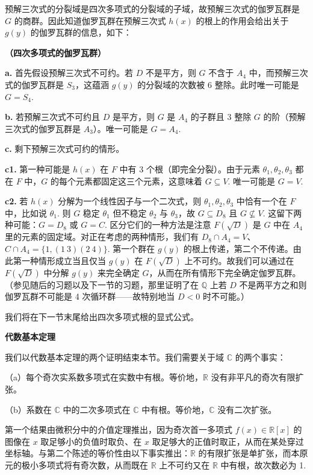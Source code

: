 预解三次式的分裂域是四次多项式的分裂域的子域，故预解三次式的伽罗瓦群是 \(G\) 的商群。因此知道伽罗瓦群在预解三次式 \(h(x)\) 的根上的作用会给出关于 \(g(y)\) 的伽罗瓦群的信息，如下：

\noindent\textbf{（四次多项式的伽罗瓦群）}

\textbf{a.} 首先假设预解三次式不可约。若 \(D\) 不是平方，则 \(G\) 不含于 \(A_4\) 中，而预解三次式的伽罗瓦群是 \(S_3\)，这蕴涵 \(g(y)\) 的分裂域的次数被 6 整除。此时唯一可能是 \(G = S_4\).

\textbf{b.} 若预解三次式不可约且 \(D\) 是平方，则 \(G\) 是 \(A_4\) 的子群且 3 整除 \(G\) 的阶（预解三次式的伽罗瓦群是 \(A_3\)）。唯一可能是 \(G = A_4\).

\textbf{c.} 剩下预解三次式可约的情形。

\textbf{c1.} 第一种可能是 \(h(x)\) 在 \(F\) 中有 3 个根（即完全分裂）。由于元素 \(\theta_1, \theta_2, \theta_3\) 都在 \(F\) 中，\(G\) 的每个元素都固定这三个元素，这意味着 \(G \subseteq V\). 唯一可能是 \(G = V\).

\textbf{c2.} 若 \(h(x)\) 分解为一个线性因子与一个二次式，则 \(\theta_1, \theta_2, \theta_3\) 中恰有一个在 \(F\) 中，比如说 \(\theta_1\). 则 \(G\) 稳定 \(\theta_1\) 但不稳定 \(\theta_2\) 与 \(\theta_3\)，故 \(G \subseteq D_8\) 且 \(G \not\subseteq V\). 这留下两种可能：\(G = D_8\) 或 \(G = C\). 区分它们的一种方法是注意 \(F(\sqrt{D})\) 是 \(G\) 中在 \(A_4\) 里的元素的固定域。对正在考虑的两种情形，我们有 \(D_8 \cap A_4 = V\)、\(C \cap A_4 = \{1, (1\ 3)(2\ 4)\}\). 第一个群在 \(g(y)\) 的根上传递，第二个不传递。由此第一种情形成立当且仅当 \(g(y)\) 在 \(F(\sqrt{D})\) 上不可约。故我们可以通过在 \(F(\sqrt{D})\) 中分解 \(g(y)\) 来完全确定 \(G\)，从而在所有情形下完全确定伽罗瓦群。（参见随后的习题以及下一节的习题，那里证明了在 \(\mathbb{Q}\) 上若 \(D\) 不是两平方之和则伽罗瓦群不可能是 4 次循环群——故特别地当 \(D < 0\) 时不可能。）

我们将在下一节末尾给出四次多项式根的显式公式。

\noindent\textbf{代数基本定理}

我们以代数基本定理的两个证明结束本节。我们需要关于域 \(\mathbb{C}\) 的两个事实：

（a）每个奇次实系数多项式在实数中有根。等价地，\(\mathbb{R}\) 没有非平凡的奇次有限扩张。

（b）系数在 \(\mathbb{C}\) 中的二次多项式在 \(\mathbb{C}\) 中有根。等价地，\(\mathbb{C}\) 没有二次扩张。

第一个结果由微积分中的介值定理推出，因为奇次首一多项式 \(f(x) \in \mathbb{R}[x]\) 的图像在 \(x\) 取足够小的负值时取负、在 \(x\) 取足够大的正值时取正，从而在某处穿过坐标轴。与第二个陈述的等价性由以下事实推出：\(\mathbb{R}\) 的有限扩张是单扩张，而本原元的极小多项式将有奇次数，从而既在 \(\mathbb{R}\) 上不可约又在 \(\mathbb{R}\) 中有根，故次数必为 1.

